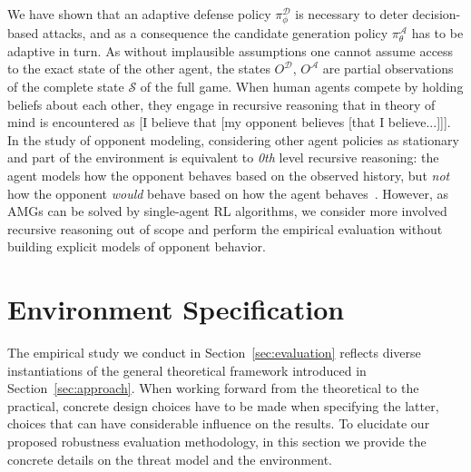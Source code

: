 We have shown that an adaptive defense policy $\pi^{\mathcal{D}}_\phi$ is necessary to deter decision-based attacks, and as a consequence the candidate generation policy $\pi^{\mathcal{A}}_\theta$ has to be adaptive in turn.
As without implausible assumptions one cannot assume access to the exact state of the other agent, the states $O^{\mathcal{D}}$, $O^{\mathcal{A}}$ are partial observations of the complete state $\mathcal{S}$ of the full game.
When human agents compete by holding beliefs about each other, they engage in recursive reasoning that in theory of mind is encountered as [I believe that [my opponent believes [that I believe...]]].
In the study of opponent modeling, considering other agent policies as stationary and part of the environment is equivalent to \textit{0th} level recursive reasoning:
the agent models how the opponent behaves based on the observed history, but \emph{not} how the opponent \emph{would} behave based on how the agent behaves~\cite{albrecht2018autonomous, wen2019probabilistic}.
However, as AMGs can be solved by single-agent RL algorithms, we consider more involved recursive reasoning out of scope and perform the empirical evaluation without building explicit models of opponent behavior.

\section{Environment Specification}
\label{sec:threat}

The empirical study we conduct in Section~\ref{sec:evaluation} reflects diverse instantiations of the general theoretical framework introduced in Section~\ref{sec:approach}.
When working forward from the theoretical to the practical, concrete design choices have to be made when specifying the latter, choices that can have considerable influence on the results.
To elucidate our proposed robustness evaluation methodology, in this section we provide the concrete details on the threat model and the environment.

